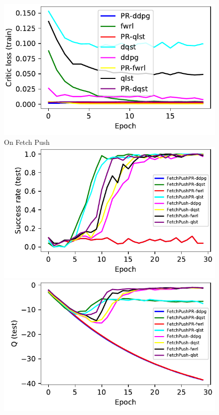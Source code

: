 \begin{figure}
  \includegraphics[width=\frac\columnwidth]{media/res/245b3c4-ce781a70-FetchReachPR-v1-fwrl-future-her_fwrl_path_reward/train/critic_loss.pdf}\\
  On Fetch Push\\
  \includegraphics[width=\frac\columnwidth]{./media/res/be0910c-her_fwrl_path_reward-FetchPushPR-v1-fwrl/test/success_rate.pdf}%
  \includegraphics[width=\frac\columnwidth]{./media/res/be0910c-her_fwrl_path_reward-FetchPushPR-v1-fwrl/test/mean_Q.pdf}%

\end{figure}
